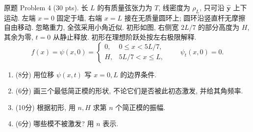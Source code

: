\begin{exercise}\label{exam:actual2.4}
原题 Problem 4 (30 pts). 长 $L$ 的有质量弦张力为 $T$, 线密度为 $\rho_L$, 只可沿 $\hat{\mathbf y}$ 上下运动. 左端 $x=0$ 固定于墙, 右端 $x=L$ 接在无质量圆环上; 圆环沿竖直杆无摩擦自由移动. 忽略重力, 全弦采用小角近似. 初形如图, 右侧宽 $2L/7$ 的部分高度为 $H$, 其余为零, $t=0$ 从静止释放. 初形在理想阶跃处按左右极限解释.
\[
f(x)=\psi(x,0)=\begin{cases}0,&0\le x<5L/7,\\H,&5L/7<x\le L,\end{cases}
\qquad \psi_t(x,0)=0.
\]
\begin{center}\end{center}
\begin{enumerate}[label=\alph*.]
\item (8分) 用位移 $\psi(x,t)$ 写 $x=0,L$ 的边界条件.
\item (6分) 画三个最低简正模的形状, 不论它们是否被此初态激发, 并给其角频率.
\item (10分) 根据初形, 用 $n,H$ 求第 $n$ 个简正模的振幅.
\item (6分) 哪些模不被激发? 用 $n$ 表示.
\end{enumerate}
\end{exercise}
